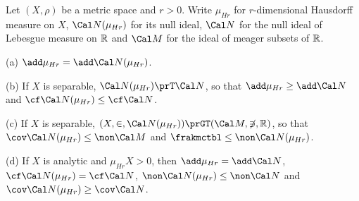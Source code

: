  Let $(X,\rho)$ be a metric space and
$r>0$.   Write $\mu_{Hr}$ for $r$-dimensional Hausdorff measure on
$X$, $\Cal N(\mu_{Hr})$ for its null ideal,
$\Cal N$ for the null ideal of Lebesgue measure on $\Bbb R$ and
$\Cal M$ for the ideal of meager subsets of $\Bbb R$.

(a) $\add\mu_{Hr}=\add\Cal N(\mu_{Hr})$.

(b) If $X$ is separable,
$\Cal N(\mu_{Hr})\prT\Cal N$, so that
$\add\mu_{Hr}\ge\add\Cal N$ and $\cf\Cal N(\mu_{Hr})\le\cf\Cal N$.

(c) If $X$ is separable,
$(X,\in,\Cal N(\mu_{Hr}))\prGT(\Cal M,\not\ni,\Bbb R)$, so that
$\cov\Cal N(\mu_{Hr})\le\non\Cal M$ and
$\frakmctbl\le\non\Cal N(\mu_{Hr})$.

(d) If $X$ is analytic and $\mu_{Hr}X>0$, then
$\add\mu_{Hr}=\add\Cal N$, $\cf\Cal N(\mu_{Hr})=\cf\Cal N$,
$\non\Cal N(\mu_{Hr})\le\non\Cal N$ and
$\cov\Cal N(\mu_{Hr})\ge\cov\Cal N$.

